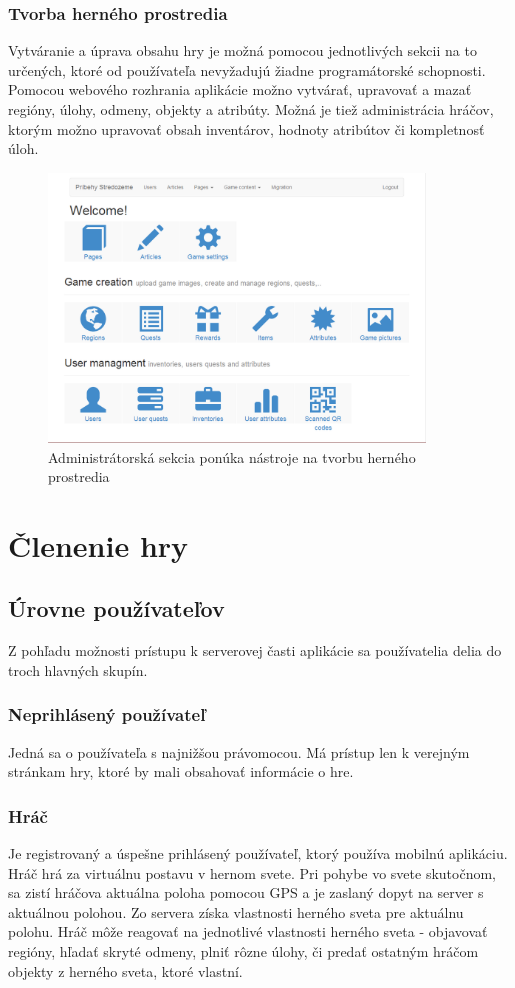\subsubsection{Tvorba herného prostredia}
Vytváranie a úprava obsahu hry je možná pomocou jednotlivých sekcii na to určených, ktoré od používateľa nevyžadujú žiadne programátorské schopnosti. Pomocou webového rozhrania aplikácie možno vytvárať, upravovať a mazať regióny, úlohy, odmeny, objekty a atribúty. Možná je tiež administrácia hráčov, ktorým možno upravovať obsah inventárov, hodnoty atribútov či kompletnosť úloh.
\begin{figure}[ht!]
  \centering
  \includegraphics[width=10cm]{mainmatter/imgs/server_menu.png}
  \caption{Administrátorská sekcia ponúka nástroje na tvorbu herného prostredia}
  \label{fig:server_menu}
\end{figure}

\section{Členenie hry}
\subsection{Úrovne používateľov}
Z pohľadu možnosti prístupu k serverovej časti aplikácie sa používatelia delia do troch hlavných skupín. 

\subsubsection{Neprihlásený používateľ}
Jedná sa o používateľa s najnižšou právomocou. Má prístup len k verejným stránkam hry, ktoré by mali obsahovať informácie o hre.

\subsubsection{Hráč}
Je registrovaný a úspešne prihlásený používateľ, ktorý používa mobilnú aplikáciu. Hráč hrá za virtuálnu postavu v hernom svete. Pri pohybe vo svete skutočnom, sa zistí hráčova aktuálna poloha pomocou GPS a je zaslaný dopyt na server s aktuálnou polohou. Zo servera získa vlastnosti herného sveta pre aktuálnu polohu. Hráč môže reagovať na jednotlivé vlastnosti herného sveta - objavovať regióny, hľadať skryté odmeny, plniť rôzne úlohy, či predať ostatným hráčom objekty z herného sveta, ktoré vlastní.

